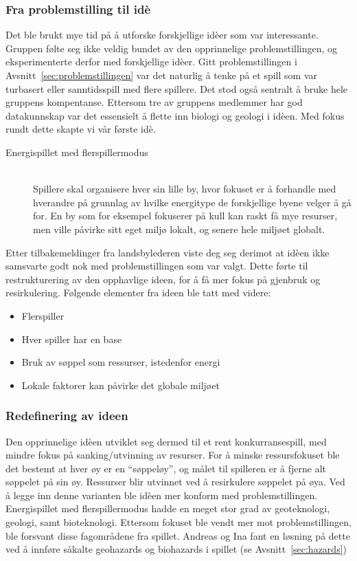 \subsubsection{Fra problemstilling til idè}
Det ble brukt mye tid på å utforske forskjellige idèer som var
interessante. Gruppen følte seg ikke veldig bundet av den opprinnelige
problemstillingen, og eksperimenterte derfor med forskjellige idèer.
Gitt problemstillingen i Avsnitt~\ref{sec:problemstillingen} var det
naturlig å tenke på et spill som var turbasert eller sanntidsspill med
flere spillere. Det stod også sentralt å bruke hele gruppens kompentanse. Ettersom tre av gruppens medlemmer har god datakunnskap var det essensielt å flette inn biologi og geologi i idèen. Med fokus rundt dette skapte vi vår første idè.
\begin{description}
\item[Energispillet med flerspillermodus] \hfill\\
Spillere skal organisere hver sin lille by, hvor fokuset er å forhandle
med hverandre på grunnlag av hvilke energitype de forskjellige byene
velger å gå for. En by som for eksempel fokuserer på kull kan raskt få
mye resurser, men ville påvirke sitt eget miljø lokalt, og senere hele
miljøet globalt.
\end{description}
Etter tilbakemeldinger fra landsbylederen viste deg seg derimot at idèen
ikke samsvarte godt nok med problemstillingen som var valgt. Dette førte
til restrukturering av den opphavlige ideen, for å få mer fokus på
gjenbruk og resirkulering. Følgende elementer fra ideen ble tatt med
videre:
\begin{itemize}
	\item Flerspiller
	\item Hver spiller har en base
	\item Bruk av søppel som ressurser, istedenfor energi
	\item Lokale faktorer kan påvirke det globale miljøet
\end{itemize}
\subsubsection{Redefinering av ideen}
Den opprinnelige idèen utviklet seg dermed til et rent konkurransespill, med
mindre fokus på sanking/utvinning av resurser. For å minske ressursfokuset
ble det bestemt at hver øy er en ``søppeløy'', og målet til spilleren er
å fjerne alt søppelet på sin øy.  Ressurser blir utvinnet ved å
resirkulere søppelet på øya. Ved å legge inn denne varianten ble idèen mer
konform med problemstillingen. Energispillet med flerspillermodus hadde en meget stor grad av geoteknologi, geologi, samt bioteknologi. Ettersom fokuset ble vendt mer mot problemstillingen, ble forsvant disse fagområdene fra spillet. Andreas og Ina fant en løsning på dette ved å innføre såkalte geohazards og biohazards i spillet (se Avsnitt~\ref{sec:hazards})

